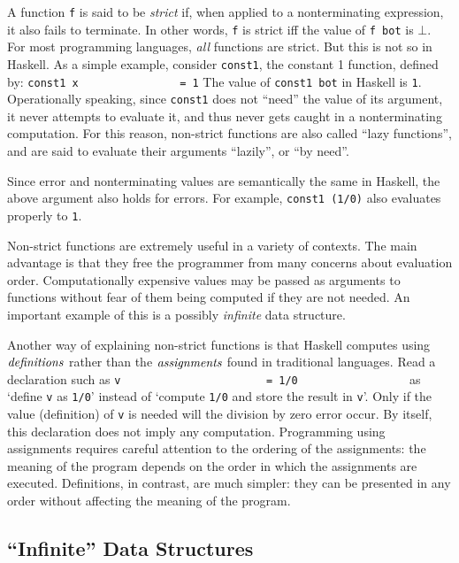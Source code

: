 A function \mbox{\tt f} is said to be {\em strict} if, when applied to a
nonterminating expression, it also fails to terminate.  In other
words, \mbox{\tt f} is strict iff the value of \mbox{\tt f\ bot} is $\bot$.  For most
programming languages, {\em all} functions are strict.  But this is
not so in Haskell.  As a simple example, consider \mbox{\tt const1}, the
constant 1 function, defined by:
\bprog
\mbox{\tt const1\ x\ \ \ \ \ \ \ \ \ \ \ \ \ \ \ \ =\ 1}
\eprog
The value of \mbox{\tt const1\ bot} in Haskell is \mbox{\tt 1}.  Operationally speaking,
since \mbox{\tt const1} does not ``need'' the value of its argument, it never
attempts to evaluate it, and thus never gets caught in a
nonterminating computation.  For this reason, non-strict functions are
also called ``lazy functions'', and are said to evaluate their
arguments ``lazily'', or ``by need''.

Since error and nonterminating values are semantically the same in
Haskell, the above argument also holds for errors.  For example,
\mbox{\tt const1\ (1/0)} also evaluates properly to \mbox{\tt 1}.

Non-strict functions are extremely useful in a variety of contexts.
The main advantage is that they free the programmer from many concerns
about evaluation order.  Computationally expensive values may be
passed as arguments to functions without fear of them being computed
if they are not needed.  An important example of this is a possibly
{\em infinite} data structure.

Another way of explaining non-strict functions is that Haskell
computes using \mbox{$\it definitions$} rather than the \mbox{$\it assignments$} found in
traditional languages.  Read a declaration such as 
\bprog
\mbox{\tt v\ \ \ \ \ \ \ \ \ \ \ \ \ \ \ \ \ \ \ \ \ \ \ =\ 1/0\ \ \ \ \ \ \ \ \ \ \ \ \ \ \ \ \ }
\eprog
as `define \mbox{\tt v} as \mbox{\tt 1/0}' instead of `compute \mbox{\tt 1/0} and store the
result in \mbox{\tt v}'.  Only if the value (definition) of \mbox{\tt v} is needed
will the division by zero error occur.  By itself, this
declaration does not imply any computation.   Programming using
assignments requires careful attention to the ordering of the
assignments: the meaning of the program depends on the order in which
the assignments are executed.  Definitions, in contrast, are much
simpler: they can be presented in any order without affecting the
meaning of the program.  


\subsection{``Infinite'' Data Structures}
\label{tut-infinite}

